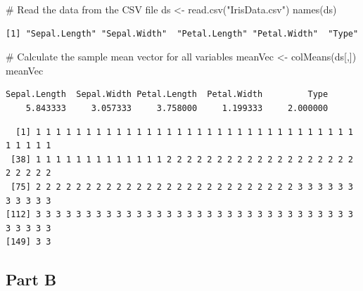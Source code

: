 \documentclass[
  letterpaper,
  DIV=11,
  numbers=noendperiod]{scrartcl}
\newenvironment{Shaded}{}{}
\newcommand{\CommentTok}[1]{\textcolor[rgb]{0.57,0.51,0.45}{#1}}
\newcommand{\FunctionTok}[1]{\textcolor[rgb]{0.41,0.62,0.42}{#1}}
\newcommand{\NormalTok}[1]{\textcolor[rgb]{0.24,0.22,0.21}{#1}}
\newcommand{\OtherTok}[1]{\textcolor[rgb]{0.41,0.62,0.42}{#1}}
\newcommand{\SpecialCharTok}[1]{\textcolor[rgb]{0.69,0.38,0.53}{#1}}
\newcommand{\StringTok}[1]{\textcolor[rgb]{0.60,0.59,0.10}{#1}}
\begin{document}
\begin{Shaded}
\begin{Highlighting}[]
\CommentTok{\# Read the data from the CSV file}
\NormalTok{ds }\OtherTok{\textless{}{-}} \FunctionTok{read.csv}\NormalTok{(}\StringTok{"IrisData.csv"}\NormalTok{)}
\FunctionTok{names}\NormalTok{(ds)}
\end{Highlighting}
\end{Shaded}

\begin{verbatim}
[1] "Sepal.Length" "Sepal.Width"  "Petal.Length" "Petal.Width"  "Type"        
\end{verbatim}

\begin{Shaded}
\begin{Highlighting}[]
\CommentTok{\# Calculate the sample mean vector for all variables}
\NormalTok{meanVec }\OtherTok{\textless{}{-}} \FunctionTok{colMeans}\NormalTok{(ds[,])}
\NormalTok{meanVec}
\end{Highlighting}
\end{Shaded}

\begin{verbatim}
Sepal.Length  Sepal.Width Petal.Length  Petal.Width         Type 
    5.843333     3.057333     3.758000     1.199333     2.000000 
\end{verbatim}

\begin{Shaded}
\end{Shaded}

\begin{verbatim}
  [1] 1 1 1 1 1 1 1 1 1 1 1 1 1 1 1 1 1 1 1 1 1 1 1 1 1 1 1 1 1 1 1 1 1 1 1 1 1
 [38] 1 1 1 1 1 1 1 1 1 1 1 1 1 2 2 2 2 2 2 2 2 2 2 2 2 2 2 2 2 2 2 2 2 2 2 2 2
 [75] 2 2 2 2 2 2 2 2 2 2 2 2 2 2 2 2 2 2 2 2 2 2 2 2 2 2 3 3 3 3 3 3 3 3 3 3 3
[112] 3 3 3 3 3 3 3 3 3 3 3 3 3 3 3 3 3 3 3 3 3 3 3 3 3 3 3 3 3 3 3 3 3 3 3 3 3
[149] 3 3
\end{verbatim}

\newpage{}

\hypertarget{part-b-3}{%
\subsection{Part B}\label{part-b-3}}
\end{document}
